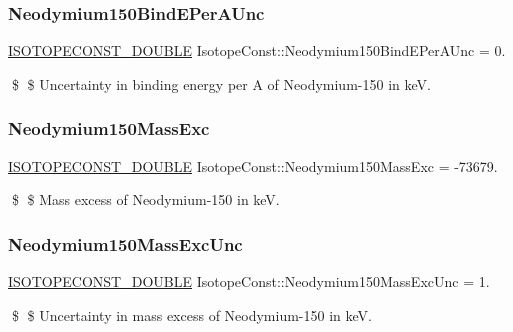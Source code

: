 \subsubsection{\texorpdfstring{Neodymium150\+Bind\+E\+Per\+A\+Unc}{Neodymium150BindEPerAUnc}}
{\footnotesize\ttfamily \mbox{\hyperlink{group___isotope_const-_macros_ga8f45a7272ce02c0b4c65c44636ed719a}{I\+S\+O\+T\+O\+P\+E\+C\+O\+N\+S\+T\+\_\+\+D\+O\+U\+B\+LE}} Isotope\+Const\+::\+Neodymium150\+Bind\+E\+Per\+A\+Unc = 0.}

\$ \$ Uncertainty in binding energy per A of Neodymium-\/150 in keV. \mbox{\label{group___isotope_const-_neodymium-_nd150_gaf40a93e27ea867dad8c36f736b84d341}} 
\subsubsection{\texorpdfstring{Neodymium150\+Mass\+Exc}{Neodymium150MassExc}}
{\footnotesize\ttfamily \mbox{\hyperlink{group___isotope_const-_macros_ga8f45a7272ce02c0b4c65c44636ed719a}{I\+S\+O\+T\+O\+P\+E\+C\+O\+N\+S\+T\+\_\+\+D\+O\+U\+B\+LE}} Isotope\+Const\+::\+Neodymium150\+Mass\+Exc = -\/73679.}

\$ \$ Mass excess of Neodymium-\/150 in keV. \mbox{\label{group___isotope_const-_neodymium-_nd150_ga2012b037f055b120c8927ba8372306e7}} 
\subsubsection{\texorpdfstring{Neodymium150\+Mass\+Exc\+Unc}{Neodymium150MassExcUnc}}
{\footnotesize\ttfamily \mbox{\hyperlink{group___isotope_const-_macros_ga8f45a7272ce02c0b4c65c44636ed719a}{I\+S\+O\+T\+O\+P\+E\+C\+O\+N\+S\+T\+\_\+\+D\+O\+U\+B\+LE}} Isotope\+Const\+::\+Neodymium150\+Mass\+Exc\+Unc = 1.}

\$ \$ Uncertainty in mass excess of Neodymium-\/150 in keV. \mbox{\label{group___isotope_const-_neodymium-_nd150_gac1e12a046cfb3c6c9e4e0706d30a825b}} 
